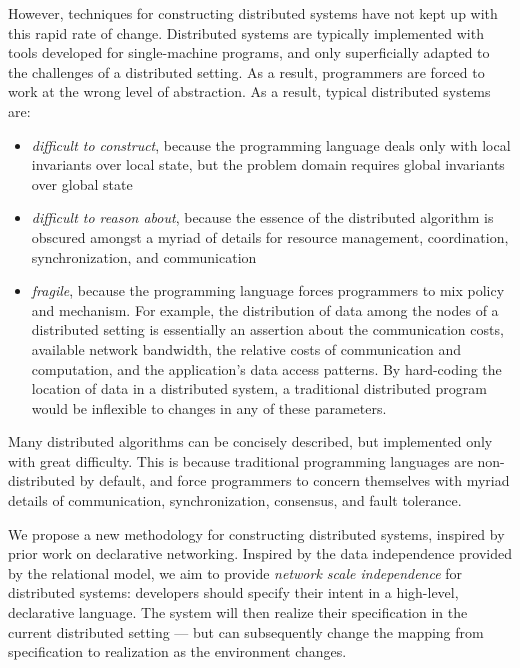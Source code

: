 \documentclass{article}
\begin{document}
However, techniques for constructing distributed systems have not kept
up with this rapid rate of change. Distributed systems are typically
implemented with tools developed for single-machine programs, and only
superficially adapted to the challenges of a distributed setting. As a
result, programmers are forced to work at the wrong level of
abstraction. As a result, typical distributed systems are:
\begin{itemize}
\item \emph{difficult to construct}, because the programming language
  deals only with local invariants over local state, but the problem
  domain requires global invariants over global state

\item \emph{difficult to reason about}, because the essence of the
  distributed algorithm is obscured amongst a myriad of details for
  resource management, coordination, synchronization, and
  communication

\item
  \emph{fragile}, because the programming language forces programmers
  to mix policy and mechanism. For example, the distribution of data
  among the nodes of a distributed setting is essentially an assertion
  about the communication costs, available network bandwidth, the
  relative costs of communication and computation, and the
  application's data access patterns. By hard-coding the location of
  data in a distributed system, a traditional distributed program
  would be inflexible to changes in any of these parameters.
\end{itemize}

Many distributed algorithms can be concisely described,
but implemented only with great difficulty. This is because
traditional programming languages are non-distributed by default, and
force programmers to concern themselves with myriad details of
communication, synchronization, consensus, and fault tolerance.

We propose a new methodology for constructing distributed systems,
inspired by prior work on declarative networking. Inspired by the data
independence provided by the relational model, we aim to provide
\emph{network scale independence} for distributed systems: developers
should specify their intent in a high-level, declarative language. The
system will then realize their specification in the current
distributed setting --- but can subsequently change the mapping from
specification to realization as the environment changes.
\end{document}
